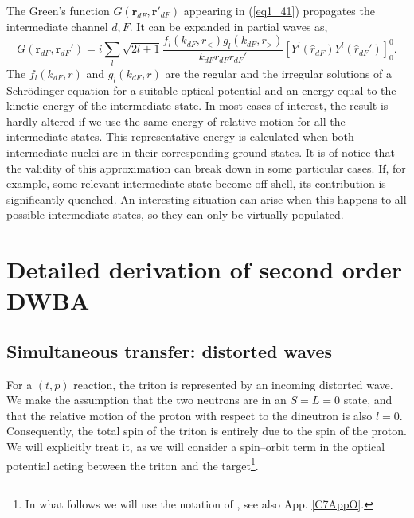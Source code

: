 The Green's function $G(\mathbf{r}_{dF},\mathbf{r}'_{dF})$ appearing in (\ref{eq1_41}) propagates the intermediate channel $d,F$. It  can be expanded in partial waves as,
\begin{equation}\label{eq7_1_12}
G(\mathbf{r}_{dF},\mathbf{r}_{dF}')=i\sum_{l}\sqrt{2l+1}
\frac{f_{l}(k_{dF},r_<)g_{l}(k_{dF},r_>)}{k_{dF}r_{dF}r_{dF}'}
\left[  Y^{l} (\hat r_{dF}) Y^{l} (\hat r_{dF}')\right]_0^0.
\end{equation}
The $f_{l}(k_{dF},r)$ and $g_l(k_{dF},r)$ are the regular and the irregular solutions of a Schr\"{o}dinger equation for  a suitable optical potential and an energy equal to the kinetic energy of the intermediate state. In most cases of interest, the result is hardly altered if we use the same energy of  relative motion for all the intermediate states. This representative energy is calculated when both intermediate nuclei are in their corresponding ground states. It is of notice that the validity of this approximation can break down in some particular cases. If, for example, some relevant intermediate state become off shell, its contribution is significantly quenched. An interesting situation can arise when this happens to all possible intermediate states, so they can only be virtually populated.
\section{Detailed derivation of second order DWBA}\label{C7S2}
\subsection{Simultaneous transfer: distorted waves}\label{Sect6.2.1}
For a $(t,p)$ reaction, the triton is represented by an incoming distorted wave. We make the assumption that the two neutrons are in an $S=L=0$ state, and that the relative motion of the proton with respect to the dineutron is also $l=0$. Consequently, the total spin of the triton   is entirely due to the spin of the proton. We will explicitly treat it, as we will consider a spin--orbit term in the optical potential acting between the triton and the target\footnote{In what follows we will use the notation of \cite{Bayman:71}, see also  App. \ref{C7AppO}.}.



